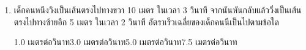 \begin{enumerate}
	\item  \nonet เด็กคนหนึงวิงเป็นเส้นตรงไปทางขวา 10 เมตร ในเวลา 3 วินาที จากนันหันกลับแล้ววิ่งเป็นเส้นตรงไปทางซ้ายอีก 5 เมตร ในเวลา 2 วินาที อัตราเร็วเฉลี่ยของเด็กคนนีเป็นไปตามข้อใด \runningj
	\begin{2c}
		{1.0 เมตรต่อวินาท}{3.0 เมตรต่อวินาท}{5.0 เมตรต่อวินาท}{7.5 เมตรต่อวินาท}
	\end{2c}
\end{enumerate}

